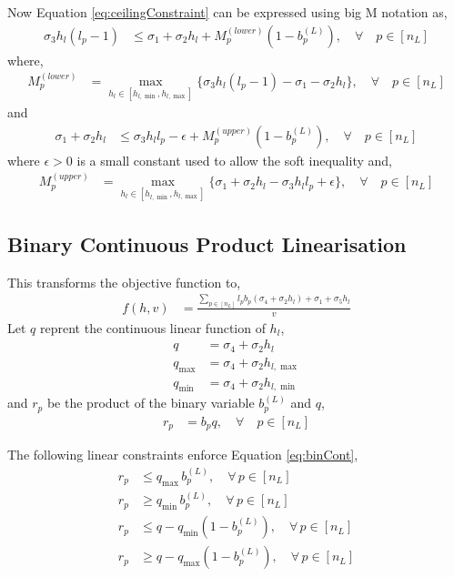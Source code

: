 \documentclass[11pt]{article}
\begin{document}
Now Equation \ref{eq:ceilingConstraint} can be expressed using big M notation as,
\begin{align}
  \sigma_3h_l(l_p-1) &\leq \sigma_1 + \sigma_2h_l +M_p^{(lower)}(1-b_p^{(L)}), \quad \forall \quad p \in [n_L]
\end{align}
where,
\begin{align}
  M_p^{(lower)} &= \max_{h_l \in [h_{l,\min}, h_{l,\max}]}\{\sigma_3h_l(l_p-1)-\sigma_1 - \sigma_2h_l\} , \quad \forall \quad p \in [n_L]
\end{align}
and 
\begin{align}
  \sigma_1 + \sigma_2h_l &\leq \sigma_3h_ll_p - \epsilon + M_p^{(upper)}(1-b_p^{(L)}), \quad \forall \quad p \in [n_L]
\end{align}
where $\epsilon>0$ is a small constant used to allow the soft inequality and,
\begin{align}
  M_p^{(upper)} &= \max_{h_l \in [h_{l,\min}, h_{l,\max}]}\{\sigma_1 + \sigma_2h_l-\sigma_3h_ll_p + \epsilon\}, \quad \forall \quad p \in [n_L]
\end{align}

\subsection{Binary Continuous Product Linearisation}
This transforms the objective function to,
\begin{align}
  f(h,v) &= \frac{\sum_{p \in [n_L]}l_pb_p(\sigma_4 + \sigma_2h_l)+\sigma_1 + \sigma_5h_l}{v}
\end{align}
Let $q$ reprent the continuous linear function of $h_l$,
\begin{align}
  q &= \sigma_4 + \sigma_2h_l\\
  q_{\max} &= \sigma_4 + \sigma_2h_{l,\max}\\
  q_{\min} &= \sigma_4 + \sigma_2h_{l,\min}
\end{align}
and $r_p$ be the product of the binary variable $b_p^{(L)}$ and $q$,
\begin{align}
  r_p &= b_pq, \quad \forall \quad p \in [n_L] \label{eq:binCont}
\end{align}

The following linear constraints enforce Equation \ref{eq:binCont},
\begin{align}
  r_{p} &\leq q_{\max}\,b_{p}^{(L)}, \quad \forall\,p\in [n_L] \\
  r_{p} &\geq q_{\min}\,b_{p}^{(L)}, \quad \forall\,p\in [n_L] \\
  r_{p} &\leq q - q_{\min}(1 - b_{p}^{(L)}), \quad \forall\,p\in [n_L] \\
  r_{p} &\geq q - q_{\max}(1 - b_{p}^{(L)}), \quad \forall\,p\in [n_L]
\end{align}
\end{document}
